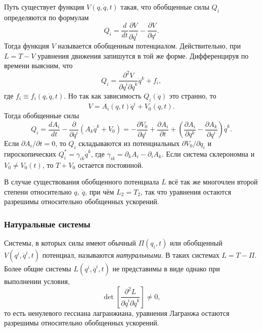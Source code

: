 Путь существует функция $V (q, \dot{q}, t)$ такая, что обобщенные силы $Q_i$ определяются по формулам
\begin{equation*}
    Q_i = \frac{d }{d t} \frac{\partial V}{\partial \dot{q}^i} - \frac{\partial V}{\partial q^i}.
\end{equation*}
Тогда функция $V$ называется обобщенным потенциалом. Действительно, при $L = T - V$ уравнения движения запишутся в той же форме. Дифференцируя по времени выясним, что
\begin{equation*}
    Q_i = \frac{\partial^2 V}{\partial \dot{q}^i \partial \dot{q}^k} \ddot{q}^k + f_i,
\end{equation*}
где $f_i \equiv f_i ( q,\dot{q}, t)$. Но так как зависимость $Q_i(\ddot{q})$ это странно, то
\begin{equation*}
    V =  A_i(q, t) \dot{q}^i + V_0(q, t).
\end{equation*}
Тогда обобщенные силы
\begin{equation*}
    Q_i = \frac{d A_i}{d t} - \frac{\partial }{\partial q^i} \left(
        A_k \dot{q}^k  + V_0
    \right) = - \frac{\partial V_0}{\partial q^i} + \frac{\partial A_i}{\partial t} +
    \left(
        \frac{\partial A_i}{\partial q^k} - \frac{\partial A_k}{\partial q^i} 
    \right) \dot{q}^k.
\end{equation*}
Если $\partial A_i / \partial t = 0$, то $Q_i$ складываются из потенциальных $\partial V_0 / \partial q_i$ и гироскопических $Q_i^* = \gamma_{ik} \dot{q}^k$, где $\gamma_{ik} = \partial_k A_i - \partial_i A_k$. Если система склерономна и $V_0 \neq V_0(t)$, то $T+V_0$ остается постоянной.

В случае существования обобщенного потенциала $L$ всё так же многочлен второй степени относительно $q, \ \dot{q}$, при чём $L_2 = T_2$, так что уравнения остаются разрешимы относительно обобщенных ускорений.


\subsubsection*{Натуральные системы}

\begin{to_def} 
    Системы, в которых силы имеют обычный $\Pi(q_i, t)$ или обобщенный $V(q^i, \dot{q}^i, t)$ потенциал, называются \textit{натуральными}. В таких системах $L = T - \Pi$.
    Более общие системы $L(q^i, \dot{q}^i, t)$ не представимы в виде однако при выполнении условия, 
    \begin{equation*}
         \det \left[
            \frac{\partial^2 L}{\partial \dot{q}^i \partial \dot{q}^k} 
         \right] \neq 0,
    \end{equation*}
    то есть ненулевого гессиана лагранжиана, 
    уравнения Лагранжа остаются разрешимы относительно обобщенных ускорений.
\end{to_def}


